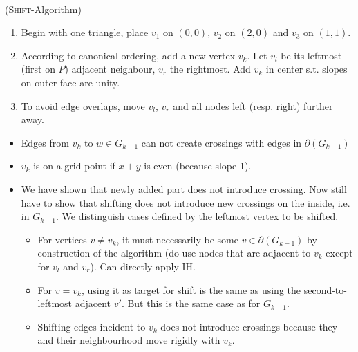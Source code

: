 \documentclass[10pt,twocolumn]{article}
\begin{document}
\paragraph{ } (\textsc{Shift}-Algorithm)
\begin{enumerate}
\item Begin with one triangle, place $v_1$ on $(0,0)$, $v_2$ on $(2,0)$ and $v_3$
  on $(1,1)$. 
\item According to canonical ordering, add a new vertex $v_k$. Let $v_l$ be its
  leftmost (first on $P$) adjacent neighbour, $v_r$ the rightmost. Add $v_k$ in
  center s.t. slopes on outer face are unity.
\item To avoid edge overlaps, move $v_l$, $v_r$ and all nodes left (resp. right)
  further away. 
\end{enumerate}

\begin{itemize}
\item Edges from $v_k$ to $w \in G_{k-1}$ can not create crossings with edges in
  $\partial(G_{k-1})$ 
\item $v_k$ is on a grid point if $x+y$ is even (because slope 1).
\item We have shown that newly added part does not introduce crossing. Now still
  have to show that shifting does not introduce new crossings on the inside,
  i.e. in $G_{k-1}$. We distinguish cases defined by the leftmost vertex to be shifted.
  \begin{itemize}
  \item For vertices $v \not= v_k$, it must necessarily be some $v \in
    \partial(G_{k-1})$ by construction of the algorithm (do use nodes that
    are adjacent to $v_k$ except for $v_l$ and $v_r$). Can directly apply IH.
  \item For $v = v_k$, using it as target for shift is the same as using the
    second-to-leftmost adjacent $v'$. But this is the same case as for $G_{k-1}$.
  \item Shifting edges incident to $v_k$ does not introduce crossings because
    they and their neighbourhood move rigidly with $v_k$.
  \end{itemize}
\end{itemize}
\end{document}
